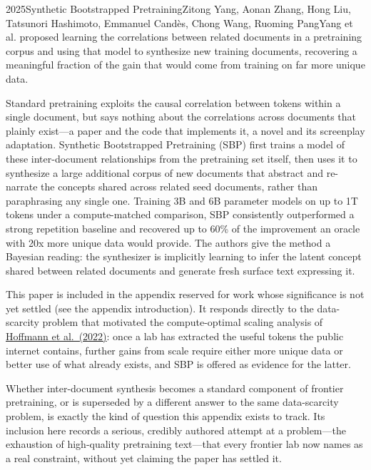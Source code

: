 
\begin{papersummary}{2025}{Synthetic Bootstrapped Pretraining}{Zitong Yang, Aonan Zhang, Hong Liu, Tatsunori Hashimoto, Emmanuel Cand\`es, Chong Wang, Ruoming Pang}{Yang et al. proposed learning the correlations between related documents in a pretraining corpus and using that model to synthesize new training documents, recovering a meaningful fraction of the gain that would come from training on far more unique data.}

Standard pretraining exploits the causal correlation between tokens within a single document, but says nothing about the correlations across documents that plainly exist---a paper and the code that implements it, a novel and its screenplay adaptation. Synthetic Bootstrapped Pretraining (SBP) first trains a model of these inter-document relationships from the pretraining set itself, then uses it to synthesize a large additional corpus of new documents that abstract and re-narrate the concepts shared across related seed documents, rather than paraphrasing any single one. Training 3B and 6B parameter models on up to 1T tokens under a compute-matched comparison, SBP consistently outperformed a strong repetition baseline and recovered up to 60\% of the improvement an oracle with 20x more unique data would provide. The authors give the method a Bayesian reading: the synthesizer is implicitly learning to infer the latent concept shared between related documents and generate fresh surface text expressing it.

This paper is included in the appendix reserved for work whose significance is not yet settled (see the appendix introduction). It responds directly to the data-scarcity problem that motivated the compute-optimal scaling analysis of \hyperref[paper:hoffmann-2022]{Hoffmann et al.\ (2022)}: once a lab has extracted the useful tokens the public internet contains, further gains from scale require either more unique data or better use of what already exists, and SBP is offered as evidence for the latter.

Whether inter-document synthesis becomes a standard component of frontier pretraining, or is superseded by a different answer to the same data-scarcity problem, is exactly the kind of question this appendix exists to track. Its inclusion here records a serious, credibly authored attempt at a problem---the exhaustion of high-quality pretraining text---that every frontier lab now names as a real constraint, without yet claiming the paper has settled it.

\end{papersummary}

